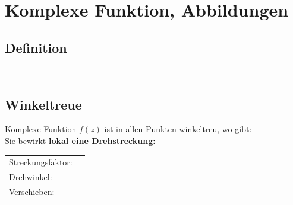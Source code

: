 \section{Komplexe Funktion, Abbildungen}
	\begin{minipage}[t]{0.5\textwidth}
		\subsection{Definition}
			\hfill\\
			\scalebox{0.5}{}
	\end{minipage}
	\begin{minipage}[t]{0.5\textwidth}
		\subsection{Winkeltreue}
			Komplexe Funktion $f\left( z \right)$ ist in allen Punkten winkeltreu, wo gibt: \\[6pt]
			Sie bewirkt \textbf{lokal eine Drehstreckung:}\\[3pt]
			\begin{tabular}{ll}
				Streckungsfaktor: & \fbox{$\left|f^{\prime}(z)\right|$}\\[3pt]
				Drehwinkel: & \fbox{$\operatorname{\arg}\left( z \right)$}\\[3pt]
				Verschieben: & \fbox{$f^{\prime}\left( z \right)$}
			\end{tabular}
	\end{minipage}

